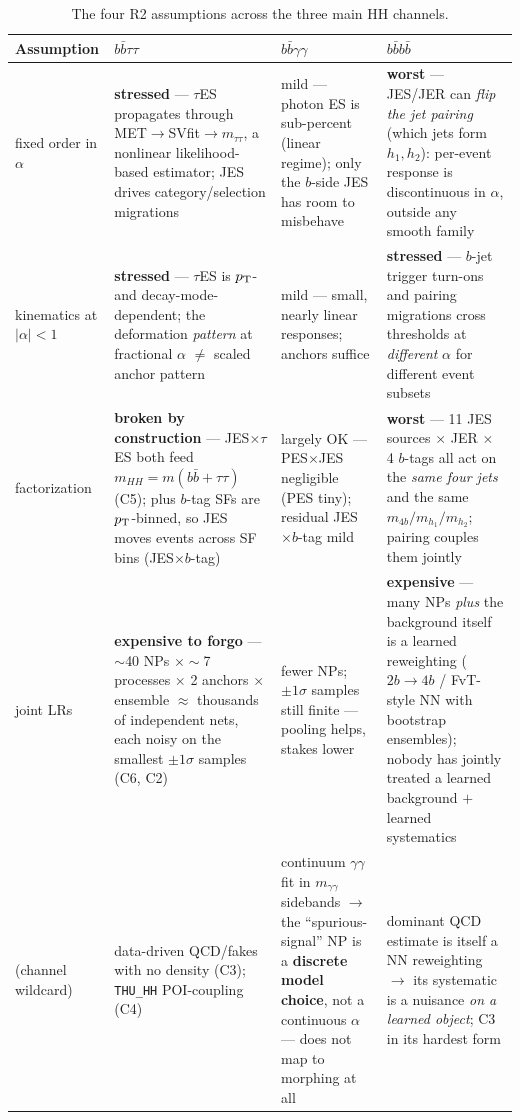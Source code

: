 \documentclass[11pt]{article}
\newcommand{\mhh}{\ensuremath{m_{HH}}}
\newcommand{\bbtt}{\ensuremath{b\bar b\tau\tau}}
\newcommand{\bbgg}{\ensuremath{b\bar b\gamma\gamma}}
\newcommand{\fourb}{\ensuremath{b\bar bb\bar b}}
\begin{document}
\begin{table}[htbp]\centering\footnotesize
\begin{tabular}{@{}p{}p{}p{}p{}@{}}
\toprule
\textbf{Assumption} & \textbf{\bbtt} & \textbf{\bbgg} & \textbf{\fourb}\\
\midrule
fixed order in $\alpha$ &
\textbf{stressed} --- $\tau$ES propagates through MET$\to$SVfit$\to m_{\tau\tau}$, a nonlinear likelihood-based
estimator; JES drives category/selection migrations &
mild --- photon ES is sub-percent (linear regime); only the $b$-side JES has room to misbehave &
\textbf{worst} --- JES/JER can \emph{flip the jet pairing} (which jets form $h_1,h_2$): per-event response is
discontinuous in $\alpha$, outside any smooth family\\
\addlinespace[3pt]
kinematics at $|\alpha|<1$ &
\textbf{stressed} --- $\tau$ES is $p_{\rm T}$- and decay-mode-dependent; the deformation \emph{pattern} at
fractional $\alpha$ $\ne$ scaled anchor pattern &
mild --- small, nearly linear responses; anchors suffice &
\textbf{stressed} --- $b$-jet trigger turn-ons and pairing migrations cross thresholds at \emph{different}
$\alpha$ for different event subsets\\
\addlinespace[3pt]
factorization &
\textbf{broken by construction} --- JES$\times\tau$ES both feed $\mhh=m(b\bar b+\tau\tau)$ (C5); plus $b$-tag
SFs are $p_{\rm T}$-binned, so JES moves events across SF bins (JES$\times b$-tag) &
largely OK --- PES$\times$JES negligible (PES tiny); residual JES$\times b$-tag mild &
\textbf{worst} --- 11 JES sources $\times$ JER $\times$ 4 $b$-tags all act on the \emph{same four jets} and the
same $m_{4b}/m_{h_1}/m_{h_2}$; pairing couples them jointly\\
\addlinespace[3pt]
joint LRs &
\textbf{expensive to forgo} --- $\sim$40 NPs $\times\sim$7 processes $\times$ 2 anchors $\times$ ensemble
$\approx$ thousands of independent nets, each noisy on the smallest $\pm1\sigma$ samples (C6, C2) &
fewer NPs; $\pm1\sigma$ samples still finite --- pooling helps, stakes lower &
\textbf{expensive} --- many NPs \emph{plus} the background itself is a learned reweighting ($2b{\to}4b$ /
FvT-style NN with bootstrap ensembles); nobody has jointly treated a learned background $+$ learned systematics\\
\addlinespace[3pt]
(channel wildcard) &
data-driven QCD/fakes with no density (C3); \texttt{THU\_HH} POI-coupling (C4) &
continuum $\gamma\gamma$ fit in $m_{\gamma\gamma}$ sidebands $\to$ the ``spurious-signal'' NP is a
\textbf{discrete model choice}, not a continuous $\alpha$ --- does not map to morphing at all &
dominant QCD estimate is itself a NN reweighting $\to$ its systematic is a nuisance \emph{on a learned object};
C3 in its hardest form\\
\bottomrule
\end{tabular}
\caption{The four R2 assumptions across the three main HH channels.}
\label{tab:channels}
\end{table}
\end{document}
